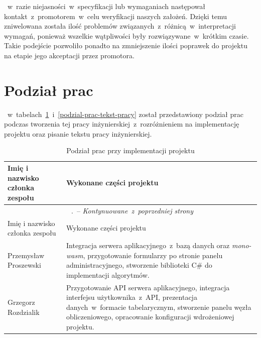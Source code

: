 \documentclass[a4paper,11pt,twoside]{report}
\renewcommand*{\thetable}{\arabic{chapter}.\arabic{table}}
\theoremstyle{definition}
\begin{document}
   ~w~razie niejasności~w~specyfikacji lub wymaganiach następował kontakt~z~promotorem~w~celu
    weryfikacji naszych założeń.
    Dzięki temu zniwelowana została ilość problemów związanych~z~różnicą~w~interpretacji wymagań,
    ponieważ wszelkie wątpliwości były rozwiązywane~w~krótkim czasie.
    Takie podejście pozwoliło ponadto na zmniejszenie ilości poprawek do projektu na etapie jego
    akceptacji przez promotora.

\section{Podział prac}
    \label{podzial-prac}
    
   ~w~tabelach~\ref{podzial-prac-implementacja}~i~\ref{podzial-prac-tekst-pracy} został przedstawiony
    podział prac podczas tworzenia tej pracy inżynierskiej~z~rozróżnieniem na implementację projektu
    oraz pisanie tekstu pracy inżynierskiej.
    
    \begin{longtable}{| p{} | p{} |}
        \caption{Podział prac przy implementacji projektu}
        \label{podzial-prac-implementacja} \\
        \hline
        Imię i nazwisko członka zespołu & Wykonane części projektu \\ \hline
        \endfirsthead
        \multicolumn{2}{c}{\tablename\ \thetable\ -- \textit{Kontynuowane~z~poprzedniej strony}} \\
        \hline
        Imię i nazwisko członka zespołu & Wykonane części projektu \\ \hline
        \endhead
        
        Przemysław Proszewski &
        Integracja serwera aplikacyjnego~z~bazą danych oraz \textit{mono-wasm}, przygotowanie formularzy
        po stronie panelu administracyjnego, stworzenie biblioteki C\# do implementacji algorytmów. \\ \hline
        
        Grzegorz Rozdzialik &
        Przygotowanie API serwera aplikacyjnego, integracja interfejsu użytkownika~z~API,
        prezentacja danych~w~formacie tabelarycznym, stworzenie panelu węzła obliczeniowego,
        opracowanie konfiguracji wdrożeniowej projektu. \\ \hline
    \end{longtable}
    
\end{document}
